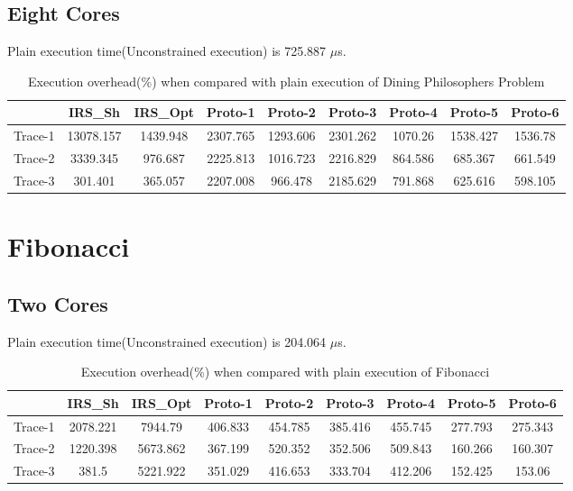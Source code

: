 \subsection{Eight Cores}
Plain execution time(Unconstrained execution) is 725.887 $\mu$s.
\begin{table}[h]
\begin{center}
 \begin{tabular}{|c c c c c c c c c|} 
 \hline
 & IRS\_Sh & IRS\_Opt& Proto-1 & Proto-2 & Proto-3 & Proto-4 & Proto-5 & Proto-6\\ %
 \hline
Trace-1 & 13078.157 & 1439.948 & 2307.765 & 1293.606 & 2301.262 & 1070.26 & 1538.427 & 1536.78\\
Trace-2 & 3339.345 & 976.687 & 2225.813 & 1016.723 & 2216.829 & 864.586 & 685.367 & 661.549\\
Trace-3 & 301.401 & 365.057 & 2207.008 & 966.478 & 2185.629 & 791.868 & 625.616 & 598.105\\
\hline
\end{tabular}
\end{center}
\caption{Execution overhead(\%) when compared with plain execution of Dining Philosophers Problem}
\label{dining_phil_irs_res_cores_8}
\end{table}
\newpage
\section{Fibonacci}

\subsection{Two Cores}
Plain execution time(Unconstrained execution) is 204.064 $\mu$s.
\begin{table}[h]
\begin{center}
 \begin{tabular}{|c c c c c c c c c|} 
 \hline
 & IRS\_Sh & IRS\_Opt& Proto-1 & Proto-2 & Proto-3 & Proto-4 & Proto-5 & Proto-6\\ %
 \hline
Trace-1 & 2078.221 & 7944.79 & 406.833 & 454.785 & 385.416 & 455.745 & 277.793 & 275.343\\
Trace-2 & 1220.398 & 5673.862 & 367.199 & 520.352 & 352.506 & 509.843 & 160.266 & 160.307\\
Trace-3 & 381.5 & 5221.922 & 351.029 & 416.653 & 333.704 & 412.206 & 152.425 & 153.06\\
\hline
\end{tabular}
\end{center}
\caption{Execution overhead(\%) when compared with plain execution of Fibonacci}
\label{fibonacci_irs_res_cores_2}
\end{table}

